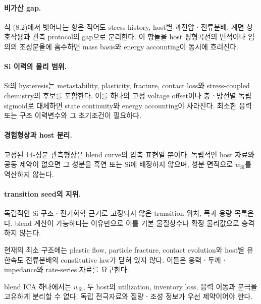 \paragraph{ 비가산 gap.}
식 (8.2)에서 벗어나는 항은 적어도 stress-history,
host별 과전압ㆍ전류분배, 계면 상호작용과 관측 protocol의 gap으로
분리한다. 이 항들을 host 평형곡선의 면적이나 임의의 조성분율에
흡수하면 mass basis와 energy accounting이 동시에 흐려진다.

\paragraph{ Si 이력의 물리 범위.}
Si의 hysteresis는 metastability, plasticity, fracture, contact
loss와 stress-coupled chemistry의 후보를 포함한다. 이를 하나의
고정 voltage offset이나 충ㆍ방전별 독립 sigmoid로 대체하면
state continuity와 energy accounting이 사라진다. 최소한 응력 또는
구조 이력변수와 그 초기조건이 필요하다.

\paragraph{ 경험형상과 host 분리.}
고정된 14-성분 관측형상은 blend curve의 압축 표현일 뿐이다.
독립적인 host 자료와 공동 제약이 없으면 그 성분을 흑연 또는 Si에
배정하지 않으며, 성분 면적으로 $w_\mathrm{Si}$를 역산하지 않는다.

\paragraph{ transition seed의 지위.}
독립적인 Si 구조ㆍ전기화학 근거로 고정되지 않은 transition 위치,
폭과 용량 목록은 다. blend 계산이
가능하다는 이유만으로 이를 기본 물질상수나 확정 물리값으로
승격하지 않는다.

\begin{openitem}
현재의 최소 구조에는 plastic flow, particle fracture, contact
evolution와 host별 유한속도 전류분배의 constitutive law가 닫혀 있지
않다. 이들은 응력ㆍ두께ㆍimpedance와 rate-series 자료를 요구한다.
\end{openitem}

\begin{identifiability}
blend ICA 하나에서는 $w_\mathrm{Si}$, 두 host의 utilization,
inventory loss, 응력 이동과 분극을 고유하게 분리할 수 없다.
독립 전극자료와 질량ㆍ조성 정보가 우선 제약이어야 한다.
\end{identifiability}

